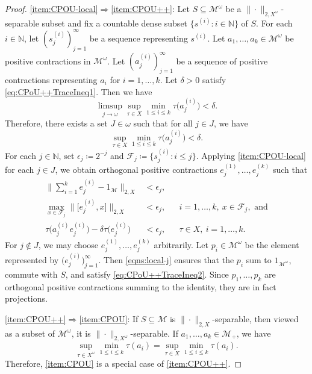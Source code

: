 \documentclass[a4paper,11pt]{amsart}
\theoremstyle{definition}
\numberwithin{equation}{section}
\numberwithin{theorem}{section}
\newcommand{\N}{\mathbb N}
\newcommand{\M}{\mathcal{M}}
\begin{document}
\begin{proof}
\ref{item:CPOU-local}$\Rightarrow$\ref{item:CPOU++}:
Let $S \subseteq \M^\omega$ be a $\|\cdot\|_{2,X^\omega}$-separable subset and fix a countable dense subset $\{s^{(i)}:i\in\N\}$ of $S$. For each $i\in\N$, let $(s^{(i)}_j)_{j=1}^\infty$ be a sequence representing $s^{(i)}$.
Let $a_1,\ldots,a_k \in \M^\omega$ be positive contractions in $\M^\omega$. Let $(a^{(i)}_j)_{j=1}^\infty$ be a sequence of positive contractions representing $a_i$ for $i=1,\ldots,k$.
Let $\delta > 0$ satisfy \eqref{eq:CPoU++TraceIneq1}.
Then we have
\begin{equation}
	\limsup_{j\to\omega} \sup_{\tau \in X} \min_{1\leq i \leq k} \tau\big(a^{(i)}_j\big) < \delta.
\end{equation}
Therefore, there exists a set $J \in \omega$ such that for all $j \in J$, we have
\begin{equation}
	\sup_{\tau \in X} \min_{1\leq i \leq k} \tau\big(a^{(i)}_j\big) < \delta.
\end{equation}
For each $j \in \N$, set $\epsilon_j \coloneqq 2^{-j}$ and $\mathcal{F}_j \coloneqq \{ s^{(i)}_j: i \leq j\}$. Applying \ref{item:CPOU-local} for each $j \in J$, we obtain orthogonal positive contractions $e^{(1)}_j,\ldots,e^{(k)}_j$ such that
\begin{equation}\begin{aligned}\label{eqns:local-j}
		\Big\|\sum_{i=1}^k e^{(i)}_j - 1_\M \Big\|_{2,X} &< \epsilon_j, &&    \\
		\max_{x \in \mathcal F_j} \big\|\big[e^{(i)}_j,x\big]\big\|_{2,X} &<\epsilon_j, && i=1,\dots,k,\ x\in \mathcal F_j,\text{ and}  \\
		\tau\big(a^{(i)}_je^{(i)}_j\big) - \delta\tau\big(e^{(i)}_j\big) &< \epsilon_j, && \tau \in X,\ i=1,\dots,k.
\end{aligned}\end{equation}
For $j \not\in J$, we may choose $e^{(1)}_j,\ldots,e^{(k)}_j$ arbitrarily. Let $p_i \in \M^\omega$ be the element represented by $\big(e^{(i)}_j\big)_{j=1}^\infty$. Then \eqref{eqns:local-j} ensures that the $p_i$ sum to $1_{\M^\omega}$, commute with $S$, and satisfy \eqref{eq:CPoU++TraceIneq2}. Since $p_1,\ldots,p_k$ are orthogonal positive contractions summing to the identity, they are in fact projections.

\ref{item:CPOU++}$\Rightarrow$\ref{item:CPOU}: If $S \subseteq \M$ is $\|\cdot\|_{2,X}$-separable, then viewed as a subset of $\M^\omega$, it is $\|\cdot\|_{2,X^\omega}$-separable. If $a_1,\ldots,a_k \in \M_+$, we have \begin{equation}
\sup_{\tau \in X^\omega}\min_{1\leq i \leq k} \tau(a_i) = \sup_{\tau \in X}\min_{1\leq i \leq k} \tau(a_i).
\end{equation} 
Therefore, \ref{item:CPOU} is a special case of \ref{item:CPOU++}.
\end{proof}
\end{document}
